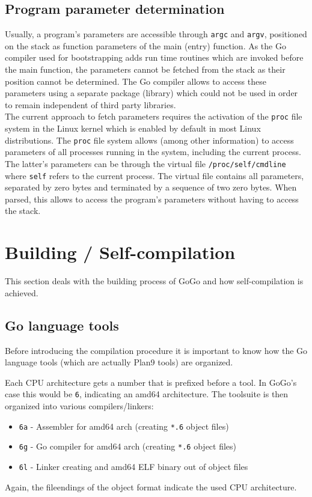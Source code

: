 \documentclass[a4paper]{scrartcl}
\let\chapter\section
\let\section\subsection
\let\subsection\subsubsection
\let\subsubsection\paragraph
\let\paragraph\subparagraph
\let\subparagraph\undefined
\begin{document}
    \section{Program parameter determination}
      Usually, a program's parameters are accessible through \texttt{argc} and \texttt{argv}, positioned on the stack as function parameters of the main (entry) function. As the Go compiler used for bootstrapping adds run time routines which are invoked before the main function, the parameters cannot be fetched from the stack as their position cannot be determined. The Go compiler allows to access these parameters using a separate package (library) which could not be used in order to remain independent of third party libraries.\\
      The current approach to fetch parameters requires the activation of the \texttt{proc} file system in the Linux kernel which is enabled by default in most Linux distributions\cite{var06}. The \texttt{proc} file system allows (among other information) to access parameters of all processes running in the system, including the current process. The latter's parameters can be through the virtual file \texttt{/proc/self/cmdline} where \texttt{self} refers to the current process. The virtual file contains all parameters, separated by zero bytes and terminated by a sequence of two zero bytes. When parsed, this allows to access the program's parameters without having to access the stack.
	
  \chapter{Building / Self-compilation}
  \label{chpt:building}
    This section deals with the building process of GoGo and how self-compilation 
    is achieved.

    \section{Go language tools}
      Before introducing the compilation procedure it is important to know how
      the Go language tools (which are actually Plan9 tools) are organized.

      Each CPU architecture gets a number that is prefixed before a tool. In
      GoGo's case this would be \texttt{6}, indicating an amd64 architecture.
      The toolsuite is then organized into various compilers/linkers:
      \begin{itemize}
        \item \texttt{6a} - Assembler for amd64 arch (creating \texttt{*.6} 
          object files)
        \item \texttt{6g} - Go compiler for amd64 arch (creating \texttt{*.6}
          object files)
        \item \texttt{6l} - Linker creating and amd64 ELF binary out of object 
          files
      \end{itemize}
      Again, the fileendings of the object format indicate the used CPU
      architecture.
\end{document}
